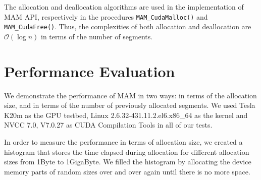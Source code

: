 \documentclass[conference]{IEEEtran}
\def\code#1{\texttt{#1}}
\begin{document}






The allocation and deallocation algorithms are used in the implementation of MAM API, respectively in the procedures \code{MAM\_CudaMalloc()} and \code{MAM\_CudaFree()}. Thus, the complexities of both allocation and deallocation are $\mathcal{O}(\log n)$ in terms of the number of segments.


\section{Performance Evaluation}
We demonstrate the performance of MAM in two ways: 
in terms of the allocation size, and in terms of the number of previously allocated segments.
We used Tesla K20m as the GPU testbed, Linux 2.6.32-431.11.2.el6.x86\_64 as the kernel and NVCC 7.0, V7.0.27 as CUDA Compilation Tools in all of our tests.

In order to measure the performance in terms of allocation size, 
we created a histogram that stores the time elapsed during allocation 
for different allocation sizes from 1Byte to 1GigaByte.
We filled the histogram by allocating the device memory 
 parts of random sizes over and over again until there is no more space. 
\end{document}
